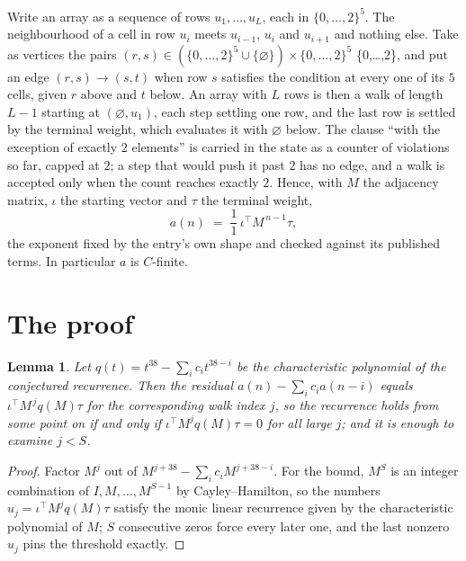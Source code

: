 \documentclass[11pt,a4paper]{article}
\theoremstyle{plain}
\newtheorem{lemma}[theorem]{Lemma}
\theoremstyle{definition}
\begin{document}
Write an array as a sequence of rows $u_1,\dots,u_L$, each in
$\{0,\dots,2\}^{5}$. The neighbourhood of a cell in row $u_i$ meets $u_{i-1}$,
$u_i$ and $u_{i+1}$ and nothing else. Take as vertices the pairs
$(r,s)\in(\{0,\dots,2\}^{5}\cup\{\varnothing\})\times\{0,\dots,2\}^{5}$ \times \{0,\dots,2\},
and put an edge $(r,s)\to(s,t)$ when row $s$ satisfies the condition at every one of its
$5$ cells, given $r$ above and $t$ below. An array with $L$ rows is then a walk of length
$L-1$ starting at $(\varnothing,u_1)$, each step settling one row, and the last row is
settled by the terminal weight, which evaluates it with $\varnothing$ below. The clause ``with the exception of exactly $2$ elements'' is carried in
the state as a counter of violations so far, capped at $2$; a step that would push it past
$2$ has no edge, and a walk is accepted only when the count reaches exactly $2$. Hence,
with $M$ the adjacency matrix, $\iota$ the starting vector and $\tau$ the terminal weight,
\[
a(n)\;=\;\frac{1}{1}\,\iota^{\!\top}M^{\,n-1}\tau ,
\]
the exponent fixed by the entry's own shape and checked against its published terms. In
particular $a$ is $C$-finite.

\section{The proof}

\begin{lemma}\label{lem:crit}
Let $q(t)=t^{38}-\sum_i c_it^{38-i}$ be the characteristic polynomial of the
conjectured recurrence. Then the residual $a(n)-\sum_ic_ia(n-i)$ equals
$\iota^{\!\top}M^{\,j}q(M)\tau$ for the corresponding walk index $j$, so the
recurrence holds from some point on if and only if $\iota^{\!\top}M^{j}q(M)\tau=0$ for all
large $j$; and it is enough to examine $j<S$.
\end{lemma}

\begin{proof}
Factor $M^{j}$ out of $M^{j+38}-\sum_ic_iM^{j+38-i}$. For the bound, $M^{S}$
is an integer combination of $I,M,\dots,M^{S-1}$ by Cayley--Hamilton, so the numbers
$u_j=\iota^{\!\top}M^{j}q(M)\tau$ satisfy the monic linear recurrence given by the
characteristic polynomial of $M$; $S$ consecutive zeros force every later one, and the last
nonzero $u_j$ pins the threshold exactly.
\end{proof}
\end{document}
